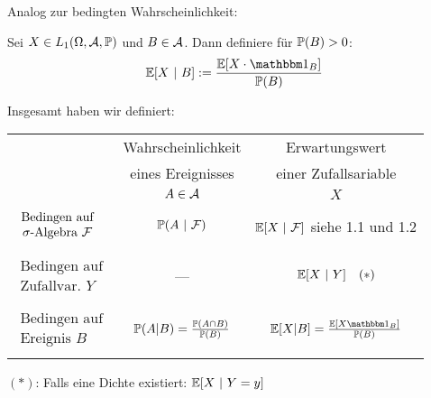 Analog zur bedingten Wahrscheinlichkeit:

\begin{defi}\enter %
	Sei $X\in L_1(\Omega,\A,\P)$ und $B\in\A$. Dann definiere für $\P(B)>0$:
	\begin{align*}
		\E[X~|~B]:=\frac{\E[X\cdot\indi_B]}{\P(B)}
	\end{align*}
\end{defi}

Insgesamt haben wir definiert:\\
\begin{tabular}{p{3cm}|c|c}
	&Wahrscheinlichkeit & Erwartungswert \\
	& eines Ereignisses & einer Zufallsariable\\
	& $A\in\A$ 					& $X$ \\ \hline
	&& \\
	$\begin{array}{c}\text{Bedingen auf}\\ \sigma\text{-Algebra } \F\end{array}$ &$\P(A~|~\F)$&$\E[X~|~\F]$ siehe 1.1 und 1.2 \\
												&& \\ \hline
	&& \\
	$\begin{array}{c}\text{Bedingen auf} \\ \text{Zufallvar. } Y\end{array}$ &---&$\E[X~|~Y]~~~(\ast)$ \\
											&& \\ \hline
	&& \\
	$\begin{array}{c} \text{Bedingen auf} \\ \text{Ereignis } B \end{array}$ &$\P(A|B)=\frac{\P(A\cap B)}{\P(B)}$&$\E[X|B]=\frac{\E[X\indi_B]}{\P(B)}$ \\
	&&
\end{tabular}\enter
$(\ast)$: Falls eine Dichte existiert: $\E[X~|~Y=y]$

